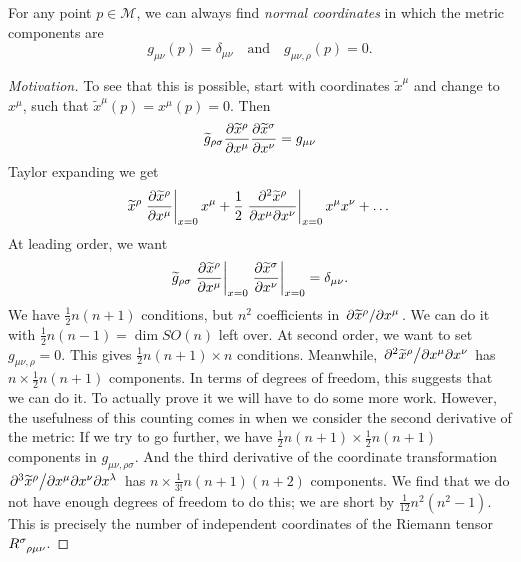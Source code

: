 \begin{claim}
  For any point $p \in \mathcal{M}$, we can always find \emph{normal coordinates} in which the metric components are
  \begin{equation}
    g_{\mu\nu}(p) = \delta_{\mu\nu} \quad \text{and} \quad g_{\mu\nu, \rho}(p) = 0.
  \end{equation}
\end{claim}
\begin{proof}[Motivation]
  To see that this is possible, start with coordinates $\widetilde x^\mu$ and change to $x^\mu$, such that $\widetilde x^\mu(p) = x^\mu(p) = 0$. Then
  \begin{equation}
    \widetilde{g}_{\rho\sigma} \pdv{\widetilde{x}^\rho}{x^\mu} \pdv{\widetilde{x}^\sigma}{x^\nu} = g_{\mu\nu}
  \end{equation}
  Taylor expanding we get
  \begin{equation}
    \widetilde{x}^\rho \left.\pdv{\widetilde{x}^\rho}{x^\mu}\right\rvert_{x = 0} x^\mu + \frac{1}{2} \left.\frac{\partial^2 \widetilde x^\rho}{\partial x^\mu \partial x^\nu}\right\rvert_{x = 0} x^\mu x^\nu + \dots
  \end{equation}
  At leading order, we want
  \begin{equation}
    \widetilde{g}_{\rho\sigma} \left.\pdv{\widetilde{x}^\rho}{x^\mu}\right\rvert_{x = 0} \left.\pdv{\widetilde{x}^\sigma}{x^\nu}\right\rvert_{x = 0} = \delta_{\mu\nu}.
  \end{equation}
  We have $\frac{1}{2} n(n+1)$ conditions, but $n^2$ coefficients in $\pdv*{\widetilde{x}^{\rho}}{x^\mu}$. We can do it with $\frac{1}{2} n(n-1) = \dim SO(n)$ left over.
  At second order, we want to set $g_{\mu\nu,\rho} = 0$. This gives $\frac{1}{2} n(n+1) \times n$ conditions. Meanwhile, $\flatfrac{\partial^2\widetilde{x}^\rho}{\partial x^\mu \partial x^\nu}$ has $n \times \frac{1}{2} n(n+1)$ components. In terms of degrees of freedom, this suggests that we can do it. To actually prove it we will have to do some more work. However, the usefulness of this counting comes in when we consider the second derivative of the metric:
  If we try to go further, we have $\frac{1}{2} n (n+1) \times \frac{1}{2} n(n+1)$ components in $g_{\mu\nu, \rho\sigma}$. And the third derivative of the coordinate transformation $\flatfrac{\partial^3 \widetilde x^\rho}{\partial x^\mu \partial x^\nu \partial x^\lambda}$ has $n \times \frac{1}{3!} n (n + 1) (n + 2)$ components.
  We find that we do not have enough degrees of freedom to do this; we are short by $\frac{1}{12}n^2 (n^2 - 1)$.
  This is precisely the number of independent coordinates of the Riemann tensor $R \indices{^\sigma_{\rho\mu\nu}}$.


\end{proof}

